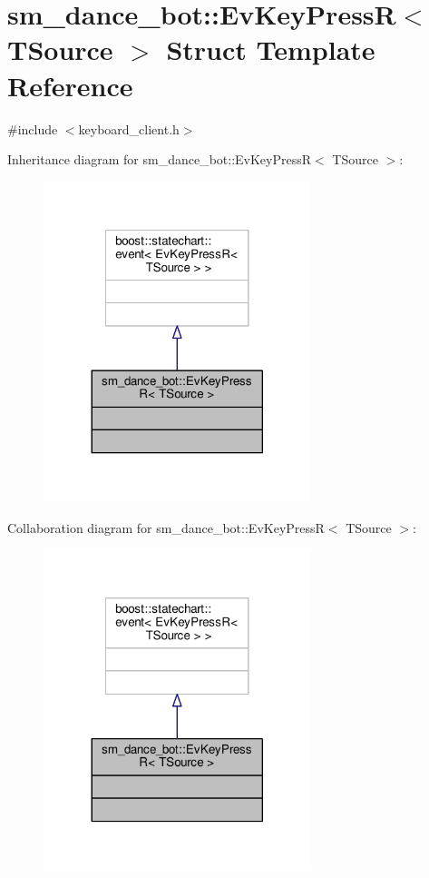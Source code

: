\hypertarget{structsm__dance__bot_1_1EvKeyPressR}{}\section{sm\+\_\+dance\+\_\+bot\+:\+:Ev\+Key\+PressR$<$ T\+Source $>$ Struct Template Reference}
\label{structsm__dance__bot_1_1EvKeyPressR}


{\ttfamily \#include $<$keyboard\+\_\+client.\+h$>$}



Inheritance diagram for sm\+\_\+dance\+\_\+bot\+:\+:Ev\+Key\+PressR$<$ T\+Source $>$\+:
\nopagebreak
\begin{figure}[H]
\begin{center}
\leavevmode
\includegraphics[width=221pt]{structsm__dance__bot_1_1EvKeyPressR__inherit__graph}
\end{center}
\end{figure}


Collaboration diagram for sm\+\_\+dance\+\_\+bot\+:\+:Ev\+Key\+PressR$<$ T\+Source $>$\+:
\nopagebreak
\begin{figure}[H]
\begin{center}
\leavevmode
\includegraphics[width=221pt]{structsm__dance__bot_1_1EvKeyPressR__coll__graph}
\end{center}
\end{figure}


